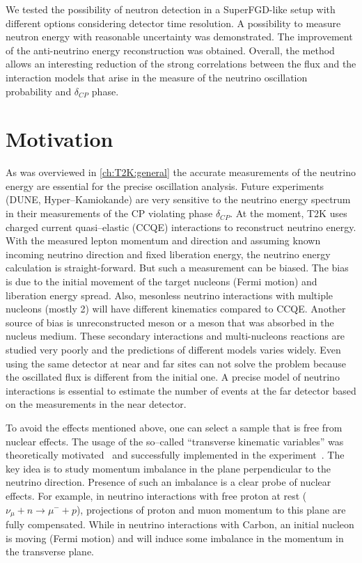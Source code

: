 \documentclass[main.tex]{subfiles}
\begin{document}
We tested the possibility of neutron detection in a SuperFGD-like setup with different options considering detector time resolution. A possibility to measure neutron energy with reasonable uncertainty was demonstrated. The improvement of the anti-neutrino energy reconstruction was obtained. Overall, the method allows an interesting reduction of the strong correlations between the flux and the interaction models that arise in the measure of the neutrino oscillation probability and $\delta_{CP}$ phase.

\section{Motivation}
As was overviewed in \autoref{ch:T2K:general} the accurate measurements of the neutrino energy are essential for the precise oscillation analysis. Future experiments (DUNE, Hyper--Kamiokande) are very sensitive to the neutrino energy spectrum in their measurements of the CP violating phase $\delta_{CP}$. At the moment, T2K uses charged current quasi--elastic (CCQE) interactions to reconstruct neutrino energy. With the measured lepton momentum and direction and assuming known incoming neutrino direction and fixed liberation energy, the neutrino energy calculation is straight-forward. But such a measurement can be biased. The bias is due to the initial movement of the target nucleons (Fermi motion) and liberation energy spread. Also, mesonless neutrino interactions with multiple nucleons (mostly 2) will have different kinematics compared to CCQE. Another source of bias is unreconstructed meson or a meson that was absorbed in the nucleus medium. These secondary interactions and multi-nucleons reactions are studied very poorly and the predictions of different models varies widely. Even using the same detector at near and far sites can not solve the problem because the oscillated flux is different from the initial one. A precise model of neutrino interactions is essential to estimate the number of events at the far detector based on the measurements in the near detector.

To avoid the effects mentioned above, one can select a sample that is free from nuclear effects. The usage of the so--called ``transverse kinematic variables'' was theoretically motivated~\cite{Lu2016} and successfully implemented in the experiment~\cite{Abe2018d}. The key idea is to study momentum imbalance in the plane perpendicular to the neutrino direction. Presence of such an imbalance is a clear probe of nuclear effects. For example, in neutrino interactions with free proton at rest ($\nu_\mu+n\to\mu^-+p$), projections of proton and muon momentum to this plane are fully compensated. While in neutrino interactions with Carbon, an initial nucleon is moving (Fermi motion) and will induce some imbalance in the momentum in the transverse plane.
\end{document}
